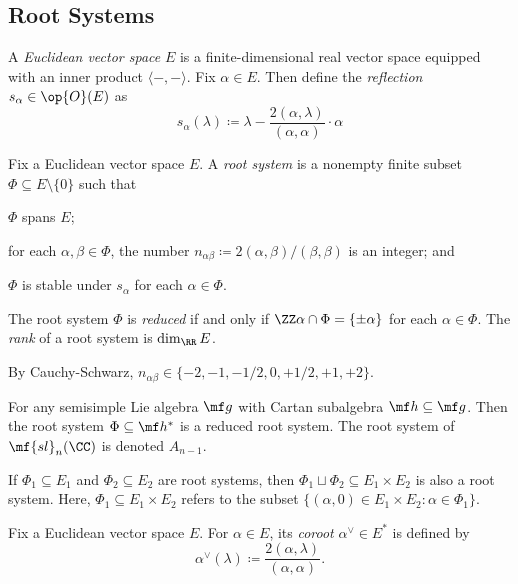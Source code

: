 \documentclass{article}
\begin{document}
\subsection{Root Systems} \label{subsec:root-system}
\begin{definition}[reflection]
	A \textit{Euclidean vector space} $E$ is a finite-dimensional real vector space equipped with an inner product $\langle-,-\rangle$. Fix $\alpha\in E$. Then define the \textit{reflection} $s_\alpha\in\op{O}(E)$ as
	\[s_\alpha(\lambda)\coloneqq\lambda-\frac{2(\alpha,\lambda)}{(\alpha,\alpha)}\cdot\alpha\]
\end{definition}
\begin{definition}
	Fix a Euclidean vector space $E$. A \textit{root system} is a nonempty finite subset $\Phi\subseteq E\setminus\{0\}$ such that
	\begin{listalph}
		\item $\Phi$ spans $E$;
		\item for each $\alpha,\beta\in\Phi$, the number $n_{\alpha\beta}\coloneqq2(\alpha,\beta)/(\beta,\beta)$ is an integer; and
		\item $\Phi$ is stable under $s_\alpha$ for each $\alpha\in\Phi$.
	\end{listalph}
	The root system $\Phi$ is \textit{reduced} if and only if $\ZZ\alpha\cap\Phi=\{\pm\alpha\}$ for each $\alpha\in\Phi$. The \textit{rank} of a root system is $\dim_\RR E$.
\end{definition}
\begin{remark}
	By Cauchy-Schwarz, $n_{\alpha\beta}\in\{-2,-1,-1/2,0,+1/2,+1,+2\}$.
\end{remark}
\begin{example}
	For any semisimple Lie algebra $\mf g$ with Cartan subalgebra $\mf h\subseteq\mf g$. Then the root system $\Phi\subseteq\mf h^*$ is a reduced root system. The root system of $\mf{sl}_n(\CC)$ is denoted $A_{n-1}$.
\end{example}
\begin{example}
	If $\Phi_1\subseteq E_1$ and $\Phi_2\subseteq E_2$ are root systems, then $\Phi_1\sqcup\Phi_2\subseteq E_1\times E_2$ is also a root system. Here, $\Phi_1\subseteq E_1\times E_2$ refers to the subset $\{(\alpha,0)\in E_1\times E_2:\alpha\in\Phi_1\}$.
\end{example}
\begin{definition}[coroot]
	Fix a Euclidean vector space $E$. For $\alpha\in E$, its \textit{coroot} $\alpha^\lor\in E^*$ is defined by
	\[\alpha^\lor(\lambda)\coloneqq\frac{2(\alpha,\lambda)}{(\alpha,\alpha)}.\]
\end{definition}
\end{document}
